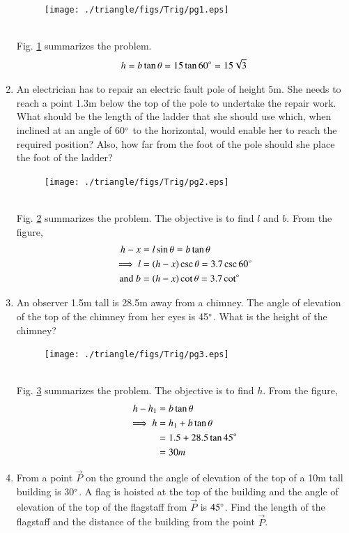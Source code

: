 \begin{enumerate}[label=\arabic*.,ref=\thesubsection.\theenumi]
%
\begin{figure}[!ht]
\texttt{[image: ./triangle/figs/Trig/pg1.eps]}
\caption{}
\label{fig:trig_pg1}
\end{figure}
%
\\
\solution Fig. \ref{fig:trig_pg1} summarizes the problem. 
%
\begin{align}
h = b\tan\theta = 15\tan60\degree = 15\sqrt{3}
\end{align}
%
\item An electrician has to repair an electric fault pole of height 5m.  She needs to reach a point 1.3m below the top of the pole to undertake the repair work.  What should be the length of the ladder that she should use which, when inclined at an angle of 60$\degree$ to the horizontal, would enable her to reach the required position?  Also, how far from the foot of the pole should she place the foot of the ladder?
%
\begin{figure}[!ht]
\texttt{[image: ./triangle/figs/Trig/pg2.eps]}
\caption{}
\label{fig:trig_pg2}
\end{figure}
%
\\
\solution Fig. \ref{fig:trig_pg2} summarizes the problem. The objective is to find $l$ and $b$.  From the figure,
%
\begin{align}
h-x &= l\sin \theta = b\tan \theta
\\
\implies l &= \left(h-x\right)\csc \theta = 3.7\csc60\degree 
\\
\text{and } b&=\left(h-x\right)\cot\theta = 3.7 \cot \degree 
\end{align}
\item An observer 1.5m tall is 28.5m away from a chimney.  The angle of elevation of the top of the chimney from her eyes is 45$\degree$.  What is the height of the chimney?
%
%
\begin{figure}[!ht]
\texttt{[image: ./triangle/figs/Trig/pg3.eps]}
\caption{}
\label{fig:trig_pg3}
\end{figure}
%
\\
\solution Fig. \ref{fig:trig_pg3} summarizes the problem. The objective is to find $h$.  From the figure,
%
\begin{align}
h-h_1 &=  b\tan \theta
\\
\implies h &= h_1+b\tan\theta 
\\
&= 1.5+28.5\tan45\degree 
\\
&= 30m
\end{align}
\item From a point $\vec{P}$ on the ground the angle of elevation of the top of a 10m tall building is 30$\degree$.  A flag is hoisted at the top of the building and the angle of elevation of the top of the flagstaff from $\vec{P}$ is $45\degree$.  Find the length of the flagstaff and the distance of the building from the point $\vec{P}$.

\end{enumerate}
